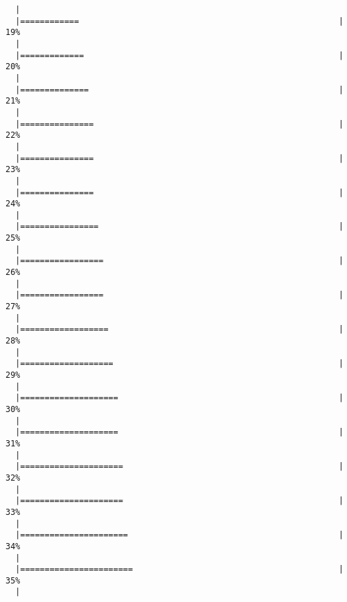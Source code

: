 \documentclass[]{article}
\begin{document}
\begin{verbatim}
  |                                                                       
  |============                                                     |  19%
  |                                                                       
  |=============                                                    |  20%
  |                                                                       
  |==============                                                   |  21%
  |                                                                       
  |===============                                                  |  22%
  |                                                                       
  |===============                                                  |  23%
  |                                                                       
  |===============                                                  |  24%
  |                                                                       
  |================                                                 |  25%
  |                                                                       
  |=================                                                |  26%
  |                                                                       
  |=================                                                |  27%
  |                                                                       
  |==================                                               |  28%
  |                                                                       
  |===================                                              |  29%
  |                                                                       
  |====================                                             |  30%
  |                                                                       
  |====================                                             |  31%
  |                                                                       
  |=====================                                            |  32%
  |                                                                       
  |=====================                                            |  33%
  |                                                                       
  |======================                                           |  34%
  |                                                                       
  |=======================                                          |  35%
  |                                                                       

\end{verbatim}
\end{document}
